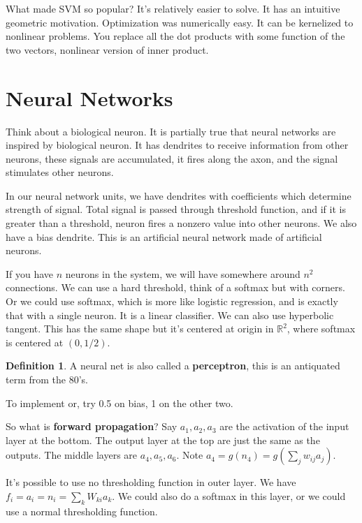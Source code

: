 \documentclass{amsbook}
\theoremstyle{plain}
\numberwithin{section}{chapter}
\numberwithin{equation}{chapter}
\theoremstyle{definition}
\newtheorem{Def}[theorem]{Definition}
\theoremstyle{remark}
\newcommand{\R}{\mathbb{R}}
\begin{document}
What made SVM so popular? It's relatively easier to solve. It has an intuitive geometric motivation. Optimization was numerically easy. It can be kernelized to nonlinear problems. You replace all the dot products with some function of the two vectors, nonlinear version of inner product. 

\section{Neural Networks}

Think about a biological neuron. It is partially true that neural networks are inspired by biological neuron. It has dendrites to receive information from other neurons, these signals are accumulated, it fires along the axon, and the signal stimulates other neurons. 


In our neural network units, we have dendrites with coefficients which determine strength of signal. Total signal is passed through threshold function, and if it is greater than a threshold, neuron fires a nonzero value into other neurons. We also have a bias dendrite. This is an artificial neural network made of artificial neurons. 

If you have $n$ neurons in the system, we will have somewhere around $n^2$ connections. We can use a hard threshold, think of a softmax but with corners. Or we could use softmax, which is more like logistic regression, and is exactly that with a single neuron. It is a linear classifier. We can also use hyperbolic tangent. This has the same shape but it's centered at origin in $\R^2$, where softmax is centered at $(0,1/2)$. 

\begin{Def}
A neural net is also called a \textbf{perceptron}, this is an antiquated term from the 80's. 
\end{Def}

To implement or, try 0.5 on bias, 1 on the other two. 



So what is \textbf{forward propagation}? Say $a_1,a_2,a_3$ are the activation of the input layer at the bottom. The output layer at the top are just the same as the outputs. The middle layers are $a_4,a_5,a_6$. Note $a_4 = g(n_4) = g(\sum_j w_{ij} a_j)$. 


It's possible to use no thresholding function in outer layer. We have $f_i = a_i = n_i = \sum_k W_{ki}a_k$. We could also do a softmax in this layer, or we could use a normal thresholding function. 
\end{document}
